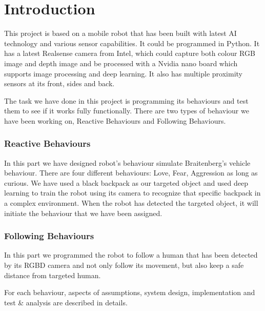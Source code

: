 \chapter{Introduction}
\label{chap:introduction}

This project is based on a mobile robot that has been built with latest AI technology and various sensor capabilities.
It could be programmed in Python.
It has a latest Realsense camera from Intel, which could capture both colour RGB image and depth image and be processed with a Nvidia nano board which supports image processing and deep learning. 
It also has multiple proximity sensors at its front, sides and back.

The task we have done in this project is programming its behaviours and test them to see if it works fully functionally. There are two types of behaviour we have been working on, Reactive Behaviours and Following Behaviours.

\subsection{Reactive Behaviours}
In this part we have designed robot’s behaviour simulate Braitenberg’s vehicle behaviour. 
There are four different behaviours: Love, Fear, Aggression as long as curious. 
We have used a black backpack as our targeted object and used deep learning to train the robot using its camera to recognize that specific backpack in a complex environment. 
When the robot has detected the targeted object, it will initiate the behaviour that we have been assigned.

\subsection{Following Behaviours}
In this part we programmed the robot to follow a human that has been detected by its RGBD camera and not only follow its movement, but also keep a safe distance from targeted human. 

For each behaviour, aspects of assumptions, system design, implementation and test \& analysis are described in details.





